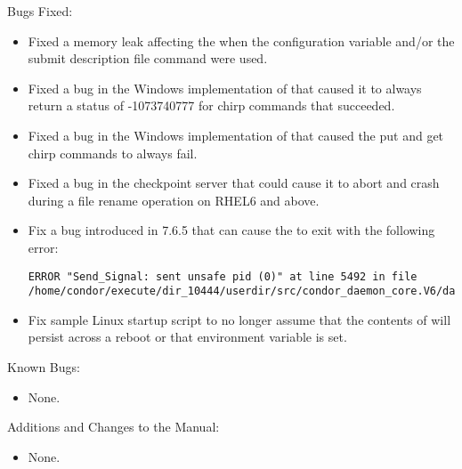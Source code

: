 \noindent Bugs Fixed:

\begin{itemize}

\item Fixed a memory leak affecting the  when the
  configuration variable
   and/or the submit
  description file command  were used.

\item Fixed a bug in the Windows implementation of  that caused
it to always return a status of -1073740777 for chirp commands that succeeded.

\item Fixed a bug in the Windows implementation of  that caused
the put and get chirp commands to always fail.

\item Fixed a bug in the checkpoint server that could cause it to abort and
crash during a file rename operation on RHEL6 and above.

\item Fix a bug introduced in 7.6.5 that can cause the  to
exit with the following error:
\begin{verbatim}
ERROR "Send_Signal: sent unsafe pid (0)" at line 5492 in file
/home/condor/execute/dir_10444/userdir/src/condor_daemon_core.V6/daemon_core.cpp
\end{verbatim}

\item Fix sample Linux startup script  to no longer
assume that the contents of  will persist across a reboot
or that environment variable  is set.

\end{itemize}

\noindent Known Bugs:

\begin{itemize}

\item None.

\end{itemize}

\noindent Additions and Changes to the Manual:

\begin{itemize}

\item None.

\end{itemize}


